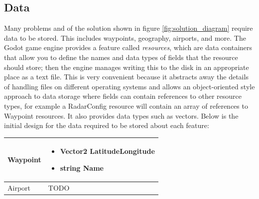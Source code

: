 \documentclass{article}
\begin{document}
\subsection{Data}
Many problems and of the solution shown in figure \ref{fig:solution_diagram} require data to be stored.
This includes waypoints, geography, airports, and more.
The Godot game engine provides a feature called \textit{resources}, which are data containers that allow you to define the names and data types of fields that the resource should store; then the engine manages writing this to the disk in an appropriate place as a text file.
This is very convenient because it abstracts away the details of handling files on different operating systems and allows an object-oriented style approach to data storage where fields can contain references to other resource types, for example a RadarConfig resource will contain an array of references to Waypoint resources.
It also provides data types such as vectors.
Below is the initial design for the data required to be stored about each feature:
\begin{center}
\begin{tabular}{ | p{5em} | p{20em} | } 
    \hline
    Waypoint &
    \begin{itemize}
        \item Vector2 LatitudeLongitude
        \item string Name
    \end{itemize}
    \\ 
    \hline
    Airport & TODO \\ 
    \hline
\end{tabular}
\end{center}
\end{document}
